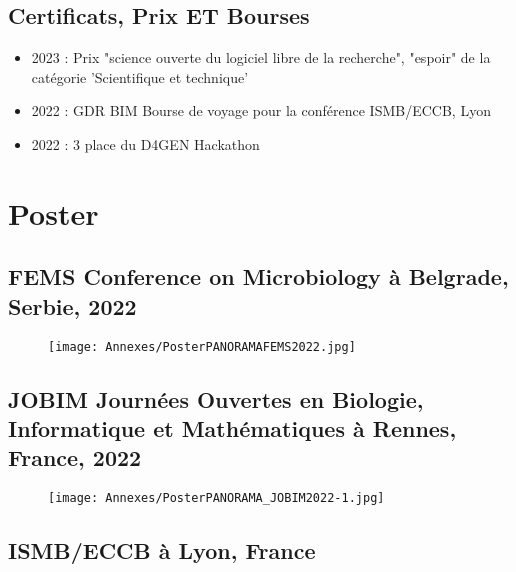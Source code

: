 \section{Certificats, Prix ET Bourses}

\begin{itemize}
    \item 2023 : Prix "science ouverte du logiciel libre de la recherche", "espoir" de la catégorie 'Scientifique et technique'
    \item 2022 : GDR BIM Bourse de voyage pour la conférence ISMB/ECCB, Lyon
    \item 2022 : 3\ieme{} place du D4GEN Hackathon
\end{itemize}


\chapter{Poster}

\section{FEMS Conference on Microbiology à  Belgrade, Serbie, 2022}

\begin{figure}[htbp]
    \centering
    \texttt{[image: Annexes/PosterPANORAMAFEMS2022.jpg]}
    \label{Ann:poster_fems}
\end{figure}

\newpage
\section{JOBIM  Journées Ouvertes en Biologie, Informatique et Mathématiques à Rennes, France, 2022}

\begin{figure}[htbp]
    \centering
    \texttt{[image: Annexes/PosterPANORAMA\_JOBIM2022-1.jpg]}
    \label{Ann:poster_jobim}
\end{figure}

\section{ISMB/ECCB à Lyon, France}

